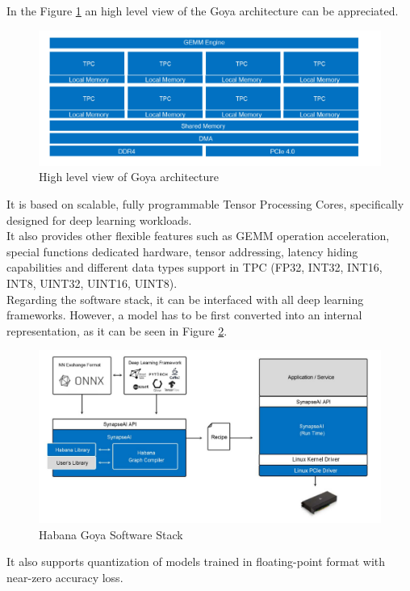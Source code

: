 In the Figure \ref{fig:goyaarch} an high level view of the Goya architecture can be appreciated.
\begin{figure}[H] 
\centering
\captionsetup{justification=centering}
  \includegraphics[scale=0.7]{./figure/goya_arch.PNG}
\caption{High level view of Goya architecture}
  \label{fig:goyaarch}
\end{figure} 

It is based on scalable, fully programmable Tensor Processing Cores, specifically designed for deep learning workloads. \\
It also provides other flexible features such as GEMM operation acceleration, special functions dedicated hardware, tensor addressing, latency hiding capabilities and different data types support in TPC (FP32,  INT32, INT16, INT8, UINT32, UINT16, UINT8).\\

Regarding the software stack, it can be interfaced with all deep learning frameworks. However, a model has to be first converted into an internal representation, as it can be seen in Figure \ref{fig:goyaswstack}.
\begin{figure}[H] 
\centering
\captionsetup{justification=centering}
  \includegraphics[scale=0.5]{./figure/goya_sw_stack.PNG}
\caption{Habana Goya Software Stack}
  \label{fig:goyaswstack}
\end{figure} 
It also supports quantization of models trained in floating-point format with near-zero accuracy loss.